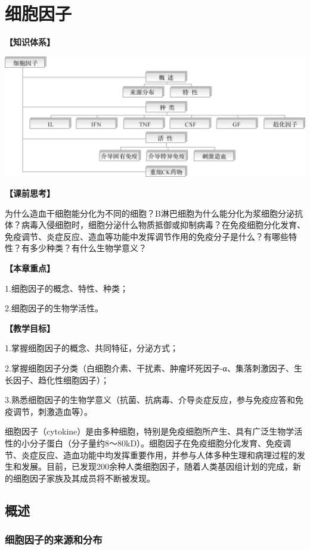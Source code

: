 \chapter{细胞因子}
\begin{framed}
\noindent\textbf{【知识体系】}
\begin{center}
\includegraphics{./images/Image00090.jpg}
\end{center}
\noindent\textbf{【课前思考】}

为什么造血干细胞能分化为不同的细胞？B淋巴细胞为什么能分化为浆细胞分泌抗体？病毒入侵细胞时，细胞分泌什么物质抵御或抑制病毒？在免疫细胞分化发育、免疫调节、炎症反应、造血等功能中发挥调节作用的免疫分子是什么？有哪些特性？有多少种类？有什么生物学意义？

\noindent\textbf{【本章重点】}

1.细胞因子的概念、特性、种类；

2.细胞因子的生物学活性。

\noindent\textbf{【教学目标】}

1.掌握细胞因子的概念、共同特征，分泌方式；

2.掌握细胞因子分类（白细胞介素、干扰素、肿瘤坏死因子-α、集落刺激因子、生长因子、趋化性细胞因子）；

3.熟悉细胞因子的生物学意义（抗菌、抗病毒、介导炎症反应，参与免疫应答和免疫调节，刺激造血等）。
\end{framed}

细胞因子（cytokine）是由多种细胞，特别是免疫细胞所产生、具有广泛生物学活性的小分子蛋白（分子量约8～80kD）。细胞因子在免疫细胞分化发育、免疫调节、炎症反应、造血功能中均发挥重要作用，并参与人体多种生理和病理过程的发生和发展。目前，已发现200余种人类细胞因子，随着人类基因组计划的完成，新的细胞因子家族及其成员将不断被发现。

\section{概述}


\subsection{细胞因子的来源和分布}

